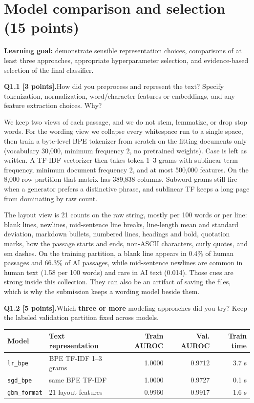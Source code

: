 \documentclass[11pt,letterpaper]{article}
\newcommand{\question}[2]{\needspace{4\baselineskip}\par\addvspace{0.45em}\noindent\textbf{#1}\quad #2\par\nobreak\vspace{0.1em}}
\begin{document}
\newpage
\section{Model comparison and selection (15 points)}
\textbf{Learning goal:} demonstrate sensible representation choices, comparisons of at least three approaches, appropriate hyperparameter selection, and evidence-based selection of the final classifier.

\question{Q1.1 [3 points].}{How did you preprocess and represent the text? Specify tokenization, normalization, word/character features or embeddings, and any feature extraction choices. Why?}

We keep two views of each passage, and we do not stem, lemmatize, or drop stop words. For the wording view we collapse every whitespace run to a single space, then train a byte-level BPE tokenizer from scratch on the fitting documents only (vocabulary 30{,}000, minimum frequency 2, no pretrained weights). Case is left as written. A TF-IDF vectorizer then takes token 1--3 grams with sublinear term frequency, minimum document frequency 2, and at most 500{,}000 features. On the 8{,}000-row partition that matrix has 389{,}838 columns. Subword grams still fire when a generator prefers a distinctive phrase, and sublinear TF keeps a long page from dominating by raw count.

The layout view is 21 counts on the raw string, mostly per 100 words or per line: blank lines, newlines, mid-sentence line breaks, line-length mean and standard deviation, markdown bullets, numbered lines, headings and bold, quotation marks, how the passage starts and ends, non-ASCII characters, curly quotes, and em dashes. On the training partition, a blank line appears in 0.4\% of human passages and 66.3\% of AI passages, while mid-sentence newlines are common in human text (1.58 per 100 words) and rare in AI text (0.014). Those cues are strong inside this collection. They can also be an artifact of saving the files, which is why the submission keeps a wording model beside them.

\question{Q1.2 [5 points].}{Which \textbf{three or more} modeling approaches did you try? Keep the labeled validation partition fixed across models.}
\begin{tabularx}{\linewidth}{@{}p{1.24in}Yrrr@{}}\toprule
Model & Text representation & Train AUROC & Val. AUROC & Train time \\ \midrule
\texttt{lr\_bpe} & BPE TF-IDF 1--3 grams & 1.0000 & 0.9712 & 3.7 s \\
\texttt{sgd\_bpe} & same BPE TF-IDF & 1.0000 & 0.9727 & 0.1 s \\
\texttt{gbm\_format} & 21 layout features & 0.9960 & 0.9917 & 1.6 s \\
\bottomrule\end{tabularx}
\end{document}
